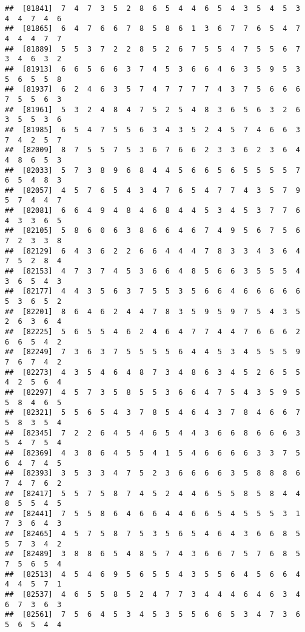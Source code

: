 \documentclass[
]{book}
\begin{document}
\begin{verbatim}
##  [81841]  7  4  7  3  5  2  8  6  5  4  4  6  5  4  3  5  4  5  3  4  4  7  4  6
##  [81865]  6  4  7  6  6  7  8  5  8  6  1  3  6  7  7  6  5  4  7  4  4  4  7  7
##  [81889]  5  5  3  7  2  2  8  5  2  6  7  5  5  4  7  5  5  6  7  3  4  6  3  2
##  [81913]  6  6  5  6  6  3  7  4  5  3  6  6  4  6  3  5  9  5  3  5  6  5  5  8
##  [81937]  6  2  4  6  3  5  7  4  7  7  7  7  4  3  7  5  6  6  6  7  5  5  6  3
##  [81961]  5  3  2  4  8  4  7  5  2  5  4  8  3  6  5  6  3  2  6  3  5  5  3  6
##  [81985]  6  5  4  7  5  5  6  3  4  3  5  2  4  5  7  4  6  6  3  7  4  2  5  7
##  [82009]  8  7  5  5  7  5  3  6  7  6  6  2  3  3  6  2  3  6  4  4  8  6  5  3
##  [82033]  5  7  3  8  9  6  8  4  4  5  6  6  5  6  5  5  5  5  7  6  5  4  8  3
##  [82057]  4  5  7  6  5  4  3  4  7  6  5  4  7  7  4  3  5  7  9  5  7  4  4  7
##  [82081]  6  6  4  9  4  8  4  6  8  4  4  5  3  4  5  3  7  7  6  4  3  3  6  5
##  [82105]  5  8  6  0  6  3  8  6  6  4  6  7  4  9  5  6  7  5  6  7  2  3  3  8
##  [82129]  6  4  3  6  2  2  6  6  4  4  4  7  8  3  3  4  3  6  4  7  5  2  8  4
##  [82153]  4  7  3  7  4  5  3  6  6  4  8  5  6  6  3  5  5  5  4  3  6  5  4  3
##  [82177]  4  4  3  5  6  3  7  5  5  3  5  6  6  4  6  6  6  6  6  5  3  6  5  2
##  [82201]  8  6  4  6  2  4  4  7  8  3  5  9  5  9  7  5  4  3  5  2  6  3  6  4
##  [82225]  5  6  5  5  4  6  2  4  6  4  7  7  4  4  7  6  6  6  2  6  6  5  4  2
##  [82249]  7  3  6  3  7  5  5  5  5  6  4  4  5  3  4  5  5  5  9  7  6  7  4  2
##  [82273]  4  3  5  4  6  4  8  7  3  4  8  6  3  4  5  2  6  5  5  4  2  5  6  4
##  [82297]  4  5  7  3  5  8  5  5  3  6  6  4  7  5  4  3  5  9  5  5  8  4  6  5
##  [82321]  5  5  6  5  4  3  7  8  5  4  6  4  3  7  8  4  6  6  7  5  8  3  5  4
##  [82345]  7  2  2  6  4  5  4  6  5  4  4  3  6  6  8  6  6  6  3  5  4  7  5  4
##  [82369]  4  3  8  6  4  5  5  4  1  5  4  6  6  6  6  3  3  7  5  6  4  7  4  5
##  [82393]  3  5  3  3  4  7  5  2  3  6  6  6  6  3  5  8  8  8  6  7  4  7  6  2
##  [82417]  5  5  7  5  8  7  4  5  2  4  4  6  5  5  8  5  8  4  4  8  5  5  4  5
##  [82441]  7  5  5  8  6  4  6  6  4  4  6  6  5  4  5  5  5  3  1  7  3  6  4  3
##  [82465]  4  5  7  5  8  7  5  3  5  6  5  4  6  4  3  6  6  8  5  5  7  3  4  2
##  [82489]  3  8  8  6  5  4  8  5  7  4  3  6  6  7  5  7  6  8  5  7  5  6  5  4
##  [82513]  4  5  4  6  9  5  6  5  5  4  3  5  5  6  4  5  6  6  4  4  4  5  7  1
##  [82537]  4  6  5  5  8  5  2  4  7  7  3  4  4  4  6  4  6  3  4  6  7  3  6  3
##  [82561]  7  5  6  4  5  3  4  5  3  5  5  6  6  5  3  4  7  3  6  5  6  5  4  4

\end{verbatim}
\end{document}
